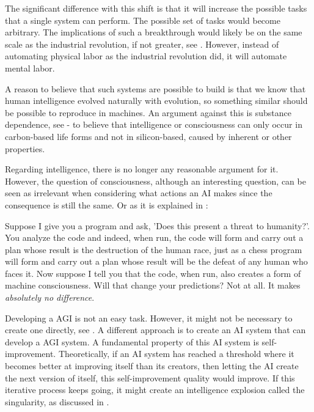 \documentclass[12pt,A4]{report}
\newcommand{\autobaj}{}
\theoremstyle{definition}
\begin{document}
The significant difference with this shift is that it will increase the possible tasks that a single system can perform. The possible set of tasks would become arbitrary. The implications of such a breakthrough would likely be on the same scale as the industrial revolution, if not greater, see \citet{CritchKruger}. However, instead of automating physical labor as the industrial revolution did, it will automate mental labor. 


A reason to believe that such systems are possible to build is that we know that human intelligence evolved naturally with evolution, so something similar should be possible to reproduce in machines. An argument against this is substance dependence, see \citet{Bostrom03} - to believe that intelligence or consciousness can only occur in carbon-based life forms and not in silicon-based, caused by inherent or other properties. 


Regarding intelligence, there is no longer any reasonable argument for it. However, the question of consciousness, although an interesting question, can be seen as irrelevant when considering what actions an AI makes since the consequence is still the same. Or as it is explained in \citet[p.22]{HumanCompatible}: 
\begin{displayquote}
  Suppose I give you a program and ask, 'Does this present a threat to humanity?'. You analyze the code and indeed, when run, the code will form and carry out a plan whose result is the destruction of the human race, just as a chess program will form and carry out a plan whose result will be the defeat of any human who faces it. Now suppose I tell you that the code, when run, also creates a form of machine consciousness. Will that change your predictions? Not at all. It makes \textit{absolutely no difference}.
\end{displayquote}

Developing a AGI is not an easy task. However, it might not be necessary to create one directly, see \citet{Bostrom14}. A different approach is to create an AI system that can develop a AGI system. A fundamental property of this AI system is self-improvement. Theoretically, if an AI system has reached a threshold where it becomes better at improving itself than its creators, then letting the AI create the next version of itself, this self-improvement quality would improve. If this iterative process keeps going, it might create an intelligence explosion called the singularity, as discussed in \citet{Yudkowsky13}. 
\end{document}
